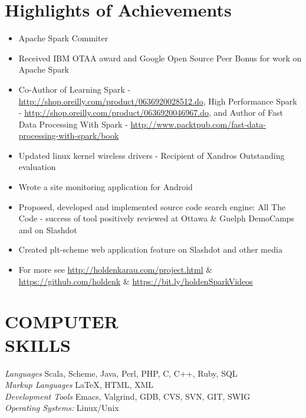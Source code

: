 \documentclass[10pt,line,margin=0.1]{newsres}
\begin{document}
\address{San Francisco, CA, USA}
\address{E-mail: holden@pigscanfly.ca, Cell: (425) 233-8271}
 
\begin{resume}
  \section{Highlights of Achievements}
  \begin{itemize}  \itemsep -2pt %
  \item{Apache Spark Commiter}
  \item{Received IBM OTAA award and Google Open Source Peer Bonus for work on Apache Spark}
  \item{Co-Author of Learning Spark - \url{http://shop.oreilly.com/product/0636920028512.do}, High Performance Spark - \url{http://shop.oreilly.com/product/0636920046967.do}, and Author of Fast Data Processing With Spark - \url{http://www.packtpub.com/fast-data-processing-with-spark/book}}
  \item{Updated linux kernel wireless drivers - Recipient of Xandros Outstanding evaluation}
  \item{Wrote a site monitoring application for Android}
  \item{Proposed, developed and implemented source code search engine: All The Code - success of tool positively reviewed at Ottawa \& Guelph DemoCamps and on Slashdot}
  \item{Created plt-scheme web application feature on Slashdot and other media}
  \item{For more see \url{http://holdenkarau.com/project.html} \& \url{https://github.com/holdenk} \& \url{https://bit.ly/holdenSparkVideos}}
\end{itemize}
\section{COMPUTER \\ SKILLS} {\sl Languages} Scala, Scheme, Java, Perl, PHP, C, C++, Ruby, SQL \\ %
                {\sl Markup Languages} \LaTeX , HTML, XML \\
                {\sl Development Tools} Emacs, Valgrind, GDB, CVS, SVN, GIT, SWIG \\
                {\sl Operating Systems:}  Linux/Unix \\
 

\end{resume}
\end{document}
